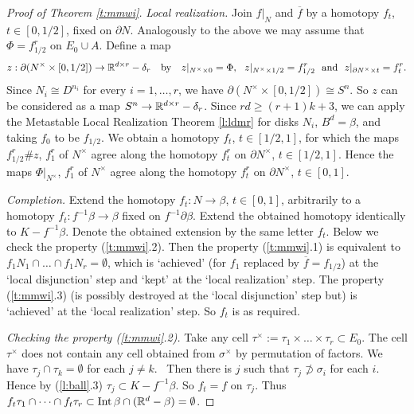 \documentclass[12pt]{article}
\def\diag{\delta}
\def\Int{\mathop{\fam0 Int}}
\theoremstyle{plain}
\theoremstyle{definition}
\begin{document}
\begin{proof}[Proof of Theorem \ref{t:mmwi}]
\smallskip
{\it Local realization.}
Join $f|_N$ and $\overline f$ by a homotopy $f_t$, $t\in[0,1/2]$, fixed on $\partial N$.
Analogously to the above we may assume that $\Phi=f_{1/2}^r$ on $E_0\cup A$.
Define a map
$$z:\partial(N^\times\times[0,1/2])\to\R^{d\times r}-\diag_r\quad\text{by}\quad
z|_{N^\times\times0}=\Phi,\ \ z|_{N^\times\times1/2}=f_{1/2}^r
\ \text{ and }\ z|_{\partial N^\times\times t}=f^r_t.$$
Since $N_i\cong D^{n_i}$ for every $i=1,\ldots,r$, we have $\partial(N^\times\times[0,1/2])\cong S^n$.
So $z$ can be considered as a map $S^n\to \R^{d\times r}-\diag_r$.
Since $rd\ge(r+1)k+3$, we can apply the Metastable Local Realization Theorem \ref{l:ldmr} for disks $N_i$, $B^d=\beta$, and taking $f_0$ to be $f_{1/2}$.
We obtain a homotopy $f_t$, $t\in[1/2,1]$, for which the maps $f_{1/2}^r\#z$, $f_1^r$ of $N^\times$ agree along the homotopy $f^r_t$ on $\partial N^\times$, $t\in[1/2,1]$.
Hence the maps $\Phi|_{N^\times}$, $f_1^r$ of $N^\times$ agree along the homotopy $f^r_t$ on $\partial N^\times$, $t\in[0,1]$.

\smallskip
{\it Completion.}
Extend the homotopy $f_t:N\to\beta$, $t\in[0,1]$, arbitrarily to a homotopy $f_t:f^{-1}\beta\to\beta$ fixed on $f^{-1}\partial\beta$.
Extend the obtained homotopy identically to $K-f^{-1}\beta$.
Denote the obtained extension by the same letter $f_t$.
Below we check the property (\ref{t:mmwi}.2).
Then the property (\ref{t:mmwi}.1) is equivalent to $f_1N_1\cap\ldots\cap f_1N_r=\emptyset$, which is `achieved' (for $f_1$ replaced by $\overline f=f_{1/2}$) at the `local disjunction' step and `kept' at the `local realization' step.
The property (\ref{t:mmwi}.3) (is possibly destroyed at the `local disjunction' step but) is `achieved' at the `local realization' step.
So $f_t$ is as required.


\smallskip
{\it Checking the property (\ref{t:mmwi}.2).}
Take any cell $\tau^\times:=\tau_1\times\ldots\times\tau_r\subset E_0$.
The cell $\tau^\times$ does not contain any cell obtained from $\sigma^\times$ by permutation of factors.
We have $\tau_j\cap\tau_k=\emptyset$ for each $j\ne k$. 
Then there is $j$ such that $\tau_j\not\supset\sigma_i$ for each $i$.
Hence by (\ref{l:ball}.3) $\tau_j\subset K-f^{-1}\beta$.
So $f_t=f$ on $\tau_j$.
Thus $f_t\tau_1\cap\dots\cap f_t\tau_r\subset\Int\beta\cap(\R^d-\beta)=\emptyset$.
\end{proof}
\end{document}
